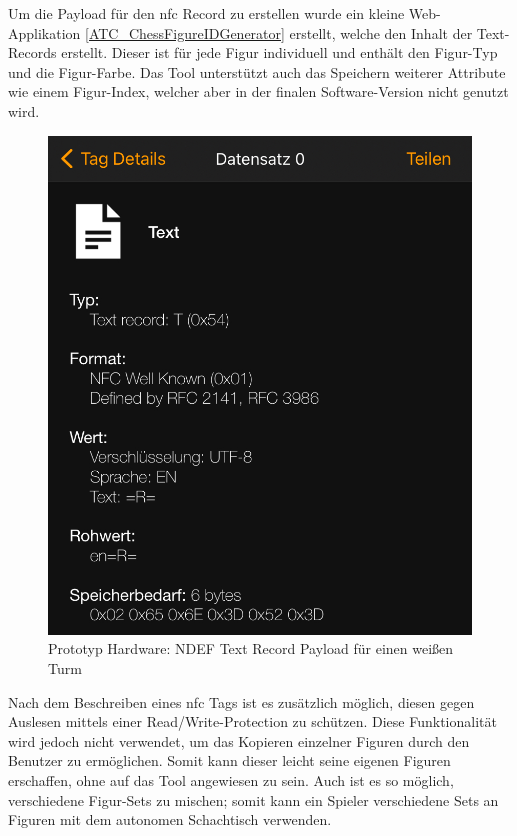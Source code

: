 Um die Payload für den \gls{nfc} Record zu erstellen wurde ein kleine
Web-Applikation \ref{ATC_ChessFigureIDGenerator} erstellt, welche den
Inhalt der Text-Records erstellt. Dieser ist für jede Figur individuell
und enthält den Figur-Typ und die Figur-Farbe. Das Tool unterstützt auch
das Speichern weiterer Attribute wie einem Figur-Index, welcher aber in
der finalen Software-Version nicht genutzt wird.

\begin{figure}
\centering
\includegraphics{images/ndef_record_rook.png}
\caption{Prototyp Hardware: NDEF Text Record Payload für einen weißen
Turm \label{ndef_record_rook}}
\end{figure}

Nach dem Beschreiben eines \gls{nfc} Tags ist es zusätzlich möglich,
diesen gegen Auslesen mittels einer Read/Write-Protection zu schützen.
Diese Funktionalität wird jedoch nicht verwendet, um das Kopieren
einzelner Figuren durch den Benutzer zu ermöglichen. Somit kann dieser
leicht seine eigenen Figuren erschaffen, ohne auf das Tool angewiesen zu
sein. Auch ist es so möglich, verschiedene Figur-Sets zu mischen; somit
kann ein Spieler verschiedene Sets an Figuren mit dem autonomen
Schachtisch verwenden.

